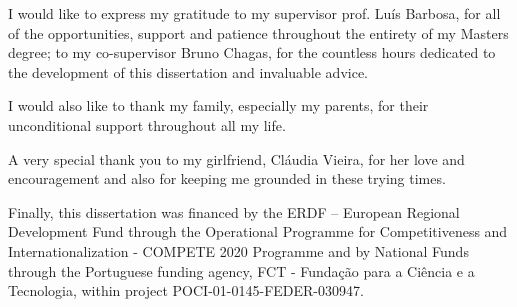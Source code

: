 \documentclass[../../dissertation.tex]{subfiles}
\begin{document}
I would like to express my gratitude to my supervisor prof. Luís Barbosa, for all of the opportunities, support and patience throughout the entirety of my Masters degree; to my co-supervisor Bruno Chagas, for the countless hours dedicated to the development of this dissertation and invaluable advice.\par
I would also like to thank my family, especially my parents, for their unconditional support throughout all my life.\par
A very special thank you to my girlfriend, Cláudia Vieira, for her love and encouragement and also for keeping me grounded in these trying times.\par 
Finally, this dissertation was financed by the ERDF – European Regional Development Fund through the Operational Programme for Competitiveness and Internationalization - COMPETE 2020 Programme and by National Funds through the Portuguese funding agency, FCT - Fundação para a Ciência e a Tecnologia, within project POCI-01-0145-FEDER-030947.\par
\end{document}
